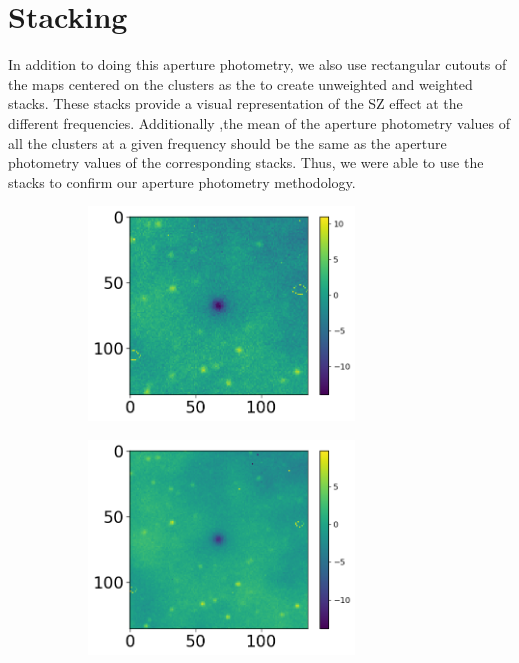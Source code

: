 \documentclass{princeton_astro_thesis}
\begin{document}
\section{Stacking}
In addition to doing this aperture photometry, we also use rectangular cutouts of the maps centered on the clusters as the to create unweighted and weighted stacks. These stacks provide a visual representation of the SZ effect at the different frequencies. Additionally ,the mean of the aperture photometry values of all the clusters at a given frequency should be the same as the aperture photometry values of the corresponding stacks. Thus, we were able to use the stacks to confirm our aperture photometry methodology. 
\begin{figure}[ht]
  \begin{subfigure}[b]{0.5\linewidth}
    \centering\includegraphics[width=200pt]{../f90_redmapper_wstack.png}
    \caption{\label{fig:fig1}}
  \end{subfigure}
  \begin{subfigure}[b]{0.1\linewidth}
    \centering\includegraphics[width=200pt]{../f150_redmapper_wstack.png}
    \caption{\label{fig:fig2}}
  \end{subfigure}
  \newline
  \begin{subfigure}[b]{0.5\linewidth}

\end{subfigure}
\end{figure}
\end{document}
